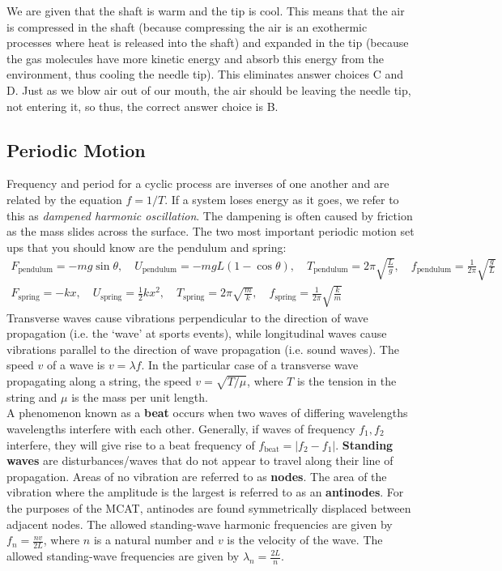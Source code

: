 \documentclass{article}
\theoremstyle{plain}%
\theoremstyle{definition}
\theoremstyle{remark}
\begin{document}
\noindent We are given that the shaft is warm and the tip is cool. This means that the air is compressed in the shaft (because compressing the air is an exothermic processes where heat is released into the shaft) and expanded in the tip (because the gas molecules have more kinetic energy and absorb this energy from the environment, thus cooling the needle tip). This eliminates answer choices C and D. Just as we blow air out of our mouth, the air should be leaving the needle tip, not entering it, so thus, the correct answer choice is B. 

\subsection{Periodic Motion}
Frequency and period for a cyclic process are inverses of one another and are related by the equation $f=1/T$. If a system loses energy as it goes, we refer to this as \textit{dampened harmonic oscillation}. The dampening is often caused by friction as the mass slides across the surface. The two most important periodic motion set ups that you should know are the pendulum and spring:
\begin{equation}
\begin{split}
F_{\text{pendulum}}=-mg\sin\theta, \quad U_{\text{pendulum}}=-mgL\left(1-\cos\theta\right), \quad T_{\text{pendulum}}=2\pi\sqrt{\frac{L}{g}}, \quad f_{\text{pendulum}}=\frac{1}{2\pi}\sqrt{\frac{g}{L}}\\
F_{\text{spring}}=-kx, \quad U_{\text{spring}}=\frac{1}{2}kx^2, \quad T_{\text{spring}}=2\pi\sqrt{\frac{m}{k}}, \quad f_{\text{spring}}=\frac{1}{2\pi}\sqrt{\frac{k}{m}}
\end{split}
\end{equation}
\noindent Transverse waves cause vibrations perpendicular to the direction of wave propagation (i.e. the `wave' at sports events), while longitudinal waves cause vibrations parallel to the direction of wave propagation (i.e. sound waves). The speed $v$ of a wave is $v=\lambda f$. In the particular case of a transverse wave propagating along a string, the speed $v=\sqrt{T/\mu}$, where $T$ is the tension in the string and $\mu$ is the mass per unit length. \\
\indent A phenomenon known as a \textbf{beat} occurs when two waves of differing wavelengths wavelengths interfere with each other. Generally, if waves of frequency $f_1, f_2$ interfere, they will give rise to a beat frequency of $f_{\text{beat}}=|f_2-f_1|$. \textbf{Standing waves} are disturbances/waves that do not appear to travel along their line of propagation. Areas of no vibration are referred to as \textbf{nodes}. The area of the vibration where the amplitude is the largest is referred to as an \textbf{antinodes}. For the purposes of the MCAT, antinodes are found symmetrically displaced between adjacent nodes. The allowed standing-wave harmonic frequencies are given by $f_n=\frac{nv}{2L}$, where $n$ is a natural number and $v$ is the velocity of the wave. The allowed standing-wave frequencies are given by $\lambda_n=\frac{2L}{n}$. \\
\end{document}
